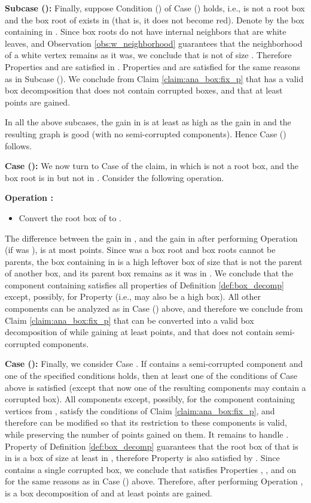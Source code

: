 \documentclass[11pt]{article}
\def\dnsitem{\vspace{-7pt}\item}
\theoremstyle{definition}
\begin{document}
\smallskip
\par\noindent
{\bf Subcase ():}
	Finally, suppose Condition () of Case () holds, i.e.,
	 is not a root box and the box root  of  exists in  (that is, it does not become red). Denote by  the box containing  in .
	Since box roots do not have internal neighbors that are white leaves, and Observation \ref{obs:w_neighborhood} guarantees that the neighborhood of a white vertex remains as it was, 
	we conclude that  is not of size .
	Therefore Properties  and  are satisfied in . 
	Properties  and  are satisfied for the same reasons as in Subcase ().
	We conclude from Claim \ref{claim:ana_box:fix_p} that  has a valid box decomposition that does not contain corrupted boxes, and that at least  points are gained.

\smallskip
\par\noindent
In all the above subcases, the gain in  is at least as high as the gain in  and the resulting graph is good (with no semi-corrupted components).
Hence Case () follows.

\bigskip
\par\noindent
{\bf Case ():}
We now turn to Case  of the claim, in which  is not a root box, and the box root  is in  but not in .
Consider the following operation.
\smallskip
\par\noindent
{\bf Operation :}
\begin{itemize}
\dnsitem[] Convert the root box  of  to .
\end{itemize}
The difference between the gain in , and the gain in  after performing Operation  (if  was ), is at most  points.
Since  was a box root and box roots cannot be parents, the box  containing  in  is a high leftover box of size  that is not the parent of another box, 
and its parent box  remains as it was in .
We conclude that the component  containing  satisfies all properties of Definition \ref{def:box_decomp} except, possibly, for Property  (i.e.,  may also be a high box).
All other components can be analyzed as in Case () above, and therefore we conclude from Claim \ref{claim:ana_box:fix_p} that  can be converted into a valid box decomposition of  while gaining at least  points, and that  does not contain semi-corrupted components.

\bigskip
\par\noindent
{\bf Case ():}
Finally, we consider Case . 
If  contains a semi-corrupted component  and one of the specified conditions holds, then at least one of the conditions of Case  above is satisfied (except that now one of the resulting components may contain a corrupted box).
All components except, possibly, for the component  containing vertices from , satisfy the conditions of Claim \ref{claim:ana_box:fix_p}, and therefore  can be modified so that its restriction to these components is valid, while preserving the number of points gained on them.
It remains to handle .
Property  of Definition \ref{def:box_decomp} guarantees that the root box of  that is in  is a box  of size at least  in ,
therefore Property  is also satisfied by . 
Since  contains a single corrupted box, we conclude that  satisfies Properties , ,  and  on  for the same reasons as in Case () above.
Therefore, after performing Operation ,  is a box decomposition of  and at least  points are gained. 
\end{document}
